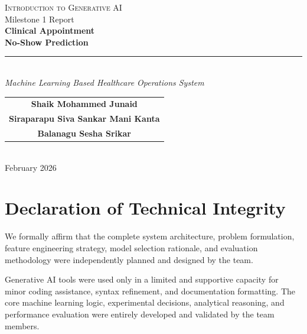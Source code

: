 \documentclass[12pt, a4paper]{report}
\begin{document}
\begin{titlepage}
  \thispagestyle{empty}

  \noindent\makebox[\linewidth]{\color{primaryblue}\rule{\paperwidth}{6pt}}
  \vspace{1.5cm}

  \begin{center}
    {\large\color{accentblue}\textsc{Introduction to Generative AI}}\\[0.4cm]
    {\normalsize\color{darkgray}Milestone 1 Report}\\[1.5cm]

    {\fontsize{28}{34}\selectfont\bfseries\color{primaryblue}
      Clinical Appointment\\[4pt]
      No-Show Prediction}\\[0.6cm]
    \color{rulecolor}\rule{0.6\linewidth}{1.5pt}\\[0.8cm]

    {\large\color{darkgray}\textit{Machine Learning Based Healthcare Operations System}}\\[2.5cm]

    \begin{tabular}{c}
      {\large\bfseries\color{primaryblue} Shaik Mohammed Junaid}\\[10pt]
      {\large\bfseries\color{primaryblue} Siraparapu Siva Sankar Mani Kanta}\\[10pt]
      {\large\bfseries\color{primaryblue} Balanagu Sesha Srikar}
    \end{tabular}\\[3cm]

    {\color{darkgray} February 2026}
  \end{center}

  \vfill
  \noindent\makebox[\linewidth]{\color{primaryblue}\rule{\paperwidth}{4pt}}
\end{titlepage}

\cleardoublepage
\thispagestyle{plain}
\chapter*{Declaration of Technical Integrity}

\begin{infobox}
We formally affirm that the complete system architecture, problem formulation,
feature engineering strategy, model selection rationale, and evaluation
methodology were independently planned and designed by the team.

\medskip
Generative AI tools were used only in a limited and supportive capacity for
minor coding assistance, syntax refinement, and documentation formatting.
The core machine learning logic, experimental decisions, analytical reasoning,
and performance evaluation were entirely developed and validated by the team
members.
\end{infobox}
\end{document}
